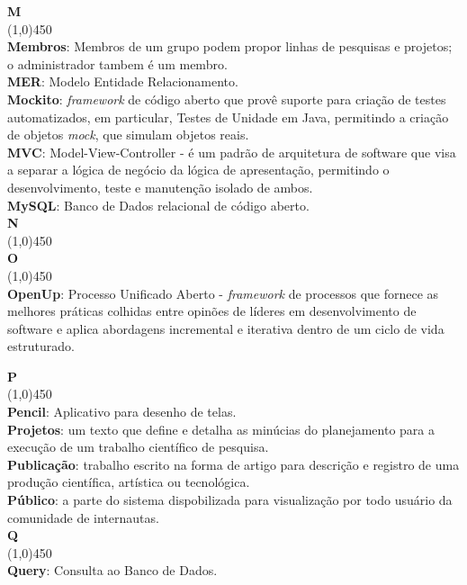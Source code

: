 \documentclass[11pt, a4paper]{article}
\begin{document}
	\noindent\textbf{\huge{M}}\\
	\line(1,0){450}\\
	\textbf{Membros}: Membros de um grupo podem propor linhas de pesquisas e projetos; 
	o administrador tambem é um membro.\\
	\textbf{MER}: Modelo Entidade Relacionamento.\\
	\textbf{Mockito}: \emph{framework} de código aberto que provê suporte para criação de testes automatizados, em particular, Testes de Unidade em Java, permitindo a criação de objetos \emph{mock}, que simulam objetos reais.\\
	\textbf{MVC}: Model-View-Controller - é um padrão de arquitetura de software
	que visa a separar a lógica de negócio da lógica de apresentação, permitindo
	o desenvolvimento, teste e manutenção isolado de ambos.\\
	\textbf{MySQL}: Banco de Dados relacional de código aberto.\\
			
	\noindent\textbf{\huge{N}}\\
	\line(1,0){450}\\
	
	\noindent\textbf{\huge{O}}\\
	\line(1,0){450}\\
	\textbf{OpenUp}: Processo Unificado Aberto - \emph{framework} de processos que fornece as melhores práticas colhidas entre opinões de líderes em desenvolvimento de software e aplica abordagens incremental e iterativa dentro de um ciclo de vida estruturado.\\
	\newpage
	
	\noindent\textbf{\huge{P}}\\
	\line(1,0){450}\\
	\textbf{Pencil}: Aplicativo para desenho de telas.\\
	\textbf{Projetos}: um texto que define e detalha as minúcias do planejamento para a execução de um trabalho científico de pesquisa.\\
	\textbf{Publicação}: trabalho escrito na forma de artigo para descrição e registro de uma produção científica, artística ou tecnológica.\\
	\textbf{Público}: a parte do sistema dispobilizada para visualização por todo usuário da comunidade de internautas.\\
	
	\noindent\textbf{\huge{Q}}\\
	\line(1,0){450}\\
	\textbf{Query}: Consulta ao Banco de Dados.\\
	
\end{document}
